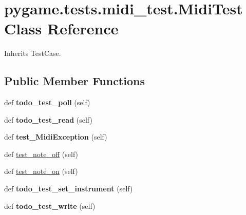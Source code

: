 \hypertarget{classpygame_1_1tests_1_1midi__test_1_1_midi_test}{}\section{pygame.\+tests.\+midi\+\_\+test.\+Midi\+Test Class Reference}
\label{classpygame_1_1tests_1_1midi__test_1_1_midi_test}


Inherits Test\+Case.

\subsection*{Public Member Functions}
\begin{DoxyCompactItemize}
\item 
\mbox{\label{classpygame_1_1tests_1_1midi__test_1_1_midi_test_a2406482627a3cd14a8320381d51b6896}} 
def {\bfseries todo\+\_\+test\+\_\+poll} (self)
\item 
\mbox{\label{classpygame_1_1tests_1_1midi__test_1_1_midi_test_a6e6566d509895cd08c31d83baf859015}} 
def {\bfseries todo\+\_\+test\+\_\+read} (self)
\item 
\mbox{\label{classpygame_1_1tests_1_1midi__test_1_1_midi_test_a916af9ee6de71ef3ab4ad787d3bb5543}} 
def {\bfseries test\+\_\+\+Midi\+Exception} (self)
\item 
def \hyperlink{classpygame_1_1tests_1_1midi__test_1_1_midi_test_a1b8f3470027619b966dcc7c60fe9f18c}{test\+\_\+note\+\_\+off} (self)
\item 
def \hyperlink{classpygame_1_1tests_1_1midi__test_1_1_midi_test_a9d3a7ec767182bba1aeac9ad22407afa}{test\+\_\+note\+\_\+on} (self)
\item 
\mbox{\label{classpygame_1_1tests_1_1midi__test_1_1_midi_test_ab2e48ca336aa274b08f54d4b88421362}} 
def {\bfseries todo\+\_\+test\+\_\+set\+\_\+instrument} (self)
\item 
\mbox{\label{classpygame_1_1tests_1_1midi__test_1_1_midi_test_a8255c6253b1c6c5d3236acebd1ef4bf9}} 
def {\bfseries todo\+\_\+test\+\_\+write} (self)

\end{DoxyCompactItemize}
